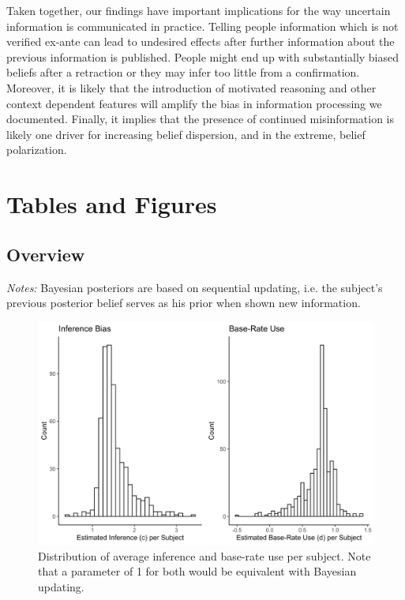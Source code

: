 \documentclass{article}
\begin{document}
Taken together, our findings have important implications for the way uncertain information is communicated in practice. Telling people information which is not verified ex-ante can lead to undesired effects after further information about the previous information is published. People might end up with substantially biased beliefs after a retraction or they may infer too little from a confirmation. Moreover, it is likely that the introduction of motivated reasoning and other context dependent features will amplify the bias in information processing we documented. Finally, it implies that the presence of continued misinformation is likely one driver for increasing belief dispersion, and in the extreme, belief polarization.

\newpage



\newpage
\appendix

\section{Tables and Figures}

\subsection{Overview}


\noindent\textit{Notes:} Bayesian posteriors are based on sequential updating, i.e. the subject's previous posterior belief serves as his prior when shown new information.



\break

\begin{figure}[!ht]
    \centering
    \includegraphics[width=12cm]{Fig/04_fig_regular_updating_type_dist.jpg}
    \caption{Distribution of average inference and base-rate use per subject. Note that a parameter of 1 for both would be equivalent with Bayesian updating.}
    \label{fig:regular_inf_baserate_type_dist}
\end{figure}
\end{document}
